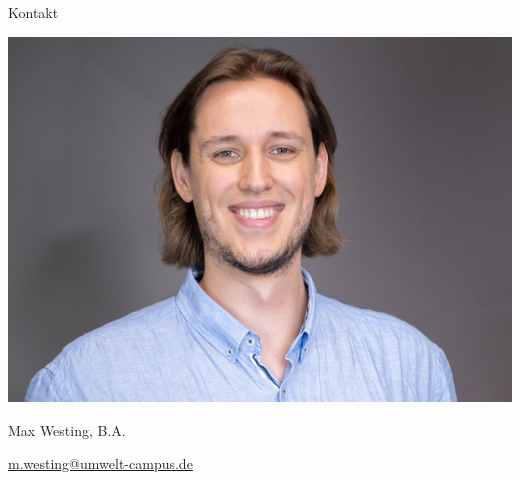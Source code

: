 \documentclass[10pt,aspectratio=169]{beamer}
\begin{document}
\begin{frame}{Kontakt}
\begin{minipage}{0.248\linewidth}
\includegraphics[width=0.9\linewidth]{assets/max.jpeg}

Max Westing, B.A.

\href{mailto:m.westing@umwelt-campus.de}{m.westing@umwelt-campus.de}

\end{minipage}
\end{frame}
\end{document}

